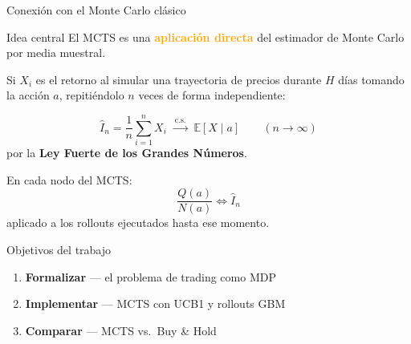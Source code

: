 \documentclass[aspectratio=169, 10pt]{beamer}
\begin{document}
\begin{frame}{Conexión con el Monte Carlo clásico}
  \begin{block}{Idea central}
    El MCTS es una \textbf{\textcolor{orange}{aplicación directa}} del estimador de Monte Carlo por media muestral.
  \end{block}

  \vspace{0.4cm}
  Si $X_i$ es el retorno al simular una trayectoria de precios durante $H$
  días tomando la acción $a$, repitiéndolo $n$ veces de forma independiente:

  \[
    \widehat{I}_n = \frac{1}{n}\sum_{i=1}^{n} X_i
    \;\xrightarrow{\ \text{c.s.}\ }\;
    \mathbb{E}[X \mid a]
    \qquad (n\to\infty) 
  \]
  por la \textbf{Ley Fuerte de los Grandes Números}.

  \vspace{0.4cm}
  \begin{alertblock}{}
  En cada nodo del MCTS:
  \begin{equation*}
  \frac{Q(a)}{N(a)}\Leftrightarrow \widehat{I}_n
  \end{equation*}
    aplicado a los rollouts ejecutados hasta ese momento.
  \end{alertblock}
\end{frame}

\begin{frame}{Objetivos del trabajo}
  \begin{enumerate}
    \item[\textbf{O1}] \textbf{Formalizar} — el problema de trading como MDP
    \vspace{0.2cm}
    \item[\textbf{O2}] \textbf{Implementar} — MCTS con UCB1 y rollouts GBM
    \vspace{0.2cm}
    \item[\textbf{O4}] \textbf{Comparar} — MCTS vs.\ Buy \& Hold
  \end{enumerate}
\end{frame}
\end{document}
